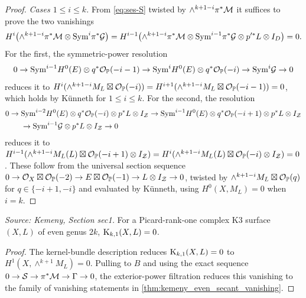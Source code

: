 \begin{proof}
  \emph{Cases \(1\le i\le k\).}  From \eqref{eq:ses-S} twisted by
  \(\wedge^{k+1-i}\pi^*\mathcal{M}\) it suffices to prove the two vanishings
  \[
    H^i\bigl(\wedge^{k+1-i}\pi^*\mathcal{M}\otimes\mathrm{Sym}^i\pi^*\mathcal{G}\bigr)
      =H^{i-1}\bigl(\wedge^{k+1-i}\pi^*\mathcal{M}\otimes\mathrm{Sym}^{i-1}\pi^*\mathcal{G}\otimes
       p'^*L\otimes I_D\bigr)=0 .
  \]
  For the first, the symmetric-power resolution
  \[
    0\to\mathrm{Sym}^{i-1}H^0(E)\otimes q^*\mathcal{O}_{\mathbb{P}}(-i-1)
      \to\mathrm{Sym}^iH^0(E)\otimes q^*\mathcal{O}_{\mathbb{P}}(-i)\to\mathrm{Sym}^i\mathcal{G}\to0
  \]
  reduces it to
  \(H^i(\wedge^{k+1-i}M_L\boxtimes\mathcal{O}_{\mathbb{P}}(-i))=
   H^{i+1}(\wedge^{k+1-i}M_L\boxtimes\mathcal{O}_{\mathbb{P}}(-i-1))=0\), which holds by Künneth
  for \(1\le i\le k\).  For the second, the resolution
  \begin{align*}
    0\to{}&\mathrm{Sym}^{i-2}H^0(E)\otimes q^*\mathcal{O}_{\mathbb{P}}(-i)\otimes p^*L\otimes I_{\mathcal{Z}}
      \to\mathrm{Sym}^{i-1}H^0(E)\otimes q^*\mathcal{O}_{\mathbb{P}}(-i+1)\otimes p^*L\otimes I_{\mathcal{Z}}\\
      &\to\mathrm{Sym}^{i-1}\mathcal{G}\otimes p^*L\otimes I_{\mathcal{Z}}\to0
  \end{align*}
  reduces it to
  \(H^{i-1}(\wedge^{k+1-i}M_L(L)\boxtimes\mathcal{O}_{\mathbb{P}}(-i+1)\otimes I_{\mathcal{Z}})=
   H^i(\wedge^{k+1-i}M_L(L)\boxtimes\mathcal{O}_{\mathbb{P}}(-i)\otimes I_{\mathcal{Z}})=0\).  These follow
  from the universal section sequence
  \(0\to\mathcal{O}_X\boxtimes\mathcal{O}_{\mathbb{P}}(-2)\to E\boxtimes\mathcal{O}_{\mathbb{P}}(-1)\to L\otimes I_{\mathcal{Z}}\to0\),
  twisted by \(\wedge^{k+1-i}M_L\boxtimes\mathcal{O}_{\mathbb{P}}(q)\) for \(q\in\{-i+1,-i\}\) and
  evaluated by Künneth, using \(H^0(X,M_L)=0\) when \(i=k\).
\end{proof}

\begin{theorem}
  \label{thm:kemeny_even_voisin}
  \textit{Source: Kemeny, Section sec1.}
  For a Picard-rank-one complex K3 surface \((X,L)\) of even genus \(2k\),
  \(\mathrm{K}_{k,1}(X,L)=0\).
\end{theorem}
\begin{proof}
  The kernel-bundle description reduces \(\mathrm{K}_{k,1}(X,L)=0\) to
  \(H^1(X,\wedge^{k+1}M_L)=0\).  Pulling to \(B\) and using the exact sequence
  \(0\to\mathcal{S}\to\pi^*\mathcal{M}\to\Gamma\to0\), the exterior-power filtration reduces
  this vanishing to the family of vanishing statements in
  \cref{thm:kemeny_even_secant_vanishing}.
\end{proof}

